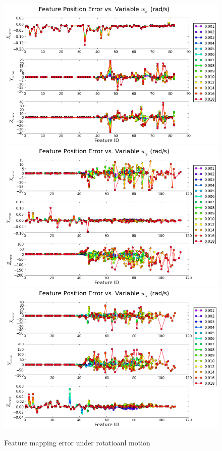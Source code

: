 \begin{figure}[h]
  \centering
  \includegraphics[scale=0.5]{./Figures/SimulationFigures/Figure17.png}
  \includegraphics[scale=0.5]{./Figures/SimulationFigures/Figure18.png}
  \includegraphics[scale=0.5]{./Figures/SimulationFigures/Figure19.png}
  \caption{Feature mapping error under rotatioanl motion}
  \label{fig:simfig17-19}
\end{figure}

